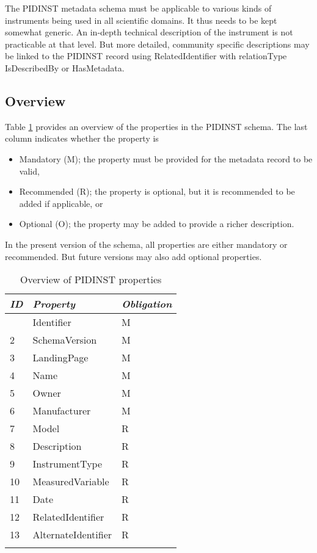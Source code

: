 \documentclass[titlepage=true,twoside=false,DIV=13]{scrartcl}
\begin{document}
The PIDINST metadata schema must be applicable to various kinds of
instruments being used in all scientific domains.  It thus needs to be
kept somewhat generic.  An in-depth technical description of the
instrument is not practicable at that level.  But more detailed,
community specific descriptions may be linked to the PIDINST record
using RelatedIdentifier with relationType IsDescribedBy or
HasMetadata.

\subsection{Overview}

Table \ref{schema:tab:propoverview} provides an overview of the
properties in the PIDINST schema.  The last column indicates whether
the property is
\begin{itemize}
\item Mandatory (M); the property must be provided for the metadata
  record to be valid,
\item Recommended (R); the property is optional, but it is recommended
  to be added if applicable, or
\item Optional (O); the property may be added to provide a richer
  description.
\end{itemize}
In the present version of the schema, all properties are either
mandatory or recommended.  But future versions may also add optional
properties.

\begin{longtable}{|l|l|l|}
  \hline
  \emph{ID} & \emph{Property} & \emph{Obligation} \\
  \hline \endhead
  \hline \endfoot\endlastfoot
  1     & Identifier          & M \\
  2     & SchemaVersion       & M \\
  3     & LandingPage         & M \\
  4     & Name                & M \\
  5     & Owner               & M \\
  6     & Manufacturer        & M \\
  7     & Model               & R \\
  8     & Description         & R \\
  9     & InstrumentType      & R \\
  10    & MeasuredVariable    & R \\
  11    & Date                & R \\
  12    & RelatedIdentifier   & R \\
  13    & AlternateIdentifier & R \\
  \hline
  \caption{Overview of PIDINST properties}
  \label{schema:tab:propoverview}
\end{longtable}
\end{document}
